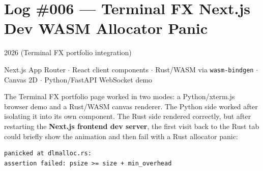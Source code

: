 \documentclass[11pt, letterpaper]{article}
\begin{document}
\section*{Log \#006 --- Terminal FX Next.js Dev WASM Allocator Panic}

\begin{tcolorbox}[colback=logbg, colframe=logborder, breakable, arc=3pt, boxrule=1pt]
\begin{description}[noitemsep, leftmargin=2cm, style=nextline]
  \item[\textbf{Date}] 2026 (Terminal FX portfolio integration)
  \item[\textbf{Stack}] Next.js App Router $\cdot$ React client components $\cdot$ Rust/WASM via \texttt{wasm-bindgen} $\cdot$ Canvas 2D $\cdot$ Python/FastAPI WebSocket demo
  \item[\textbf{Symptom}] The Terminal FX portfolio page worked in two modes: a Python/xterm.js browser demo and a Rust/WASM canvas renderer. The Python side worked after isolating it into its own component. The Rust side rendered correctly, but after restarting the \textbf{Next.js frontend dev server}, the first visit back to the Rust tab could briefly show the animation and then fail with a Rust allocator panic:
  \begin{lstlisting}[style=gitlog]
panicked at dlmalloc.rs:
assertion failed: psize >= size + min_overhead


\end{lstlisting}
\end{description}
\end{tcolorbox}
\end{document}
